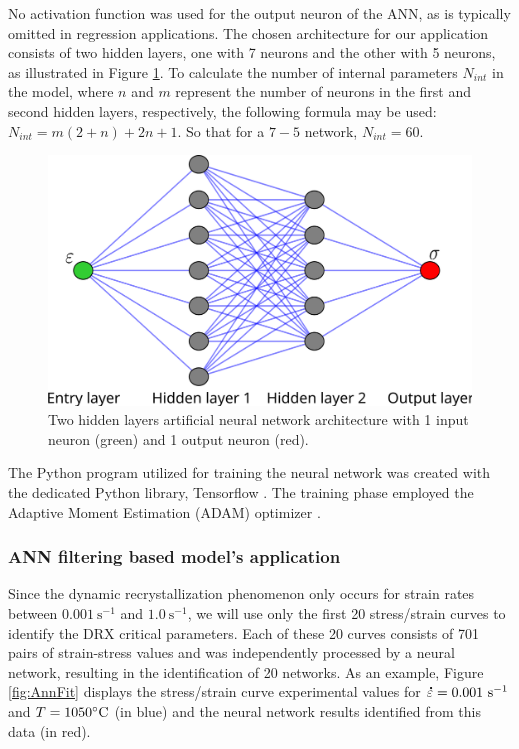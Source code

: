 \documentclass[metals,article,submit,pdftex,moreauthors]{Definitions/mdpi}
\DeclareRobustCommand{\mdot}[1]{\accentset{\mbox{\bfseries .}}{#1}}
\DeclareRobustCommand{\ps}{\text{s}^{-1}}
\begin{document}
No activation function was used for the output neuron of the ANN, as is typically omitted in regression applications.
The chosen architecture for our application consists of two hidden layers, one with 7 neurons and the other with 5 neurons, as illustrated in Figure \ref{fig:ANN-7-5}.
To calculate the number of internal parameters $N_{int}$ in the model, where $n$ and $m$ represent the number of neurons in the first and second hidden layers, respectively, the following formula may be used: $N_{int}=m(2+n)+2n+1$.
So that for a $7-5$ network, $N_{int}=60$.
\begin{figure}[H]
\centering
\includegraphics[width=0.7\columnwidth]{Figures/ANN-7-5}
\caption{Two hidden layers artificial neural network architecture with 1 input neuron (green) and 1 output neuron (red).}
\label{fig:ANN-7-5}
\end{figure}
The Python program utilized for training the neural network was created with the dedicated Python library, Tensorflow \cite{Abadi-2016}.
The training phase employed the Adaptive Moment Estimation (ADAM) optimizer \cite{Kingma-2015}.

\subsubsection{ANN filtering based model's application \label{subsec:ANNapplication}}

Since the dynamic recrystallization phenomenon only occurs for strain rates between $0.001~\ps$ and $1.0~\ps$, we will use only the first 20 stress/strain curves to identify the DRX critical parameters.
Each of these 20 curves consists of 701 pairs of strain-stress values and was independently processed by a neural network, resulting in the identification of 20 networks.
As an example, Figure \ref{fig:AnnFit} displays the stress/strain curve experimental values for $\mdot\varepsilon=0.001~\ps$ and $T=1050\celsius$ (in blue) and the neural network results identified from this data (in red).
\end{document}
